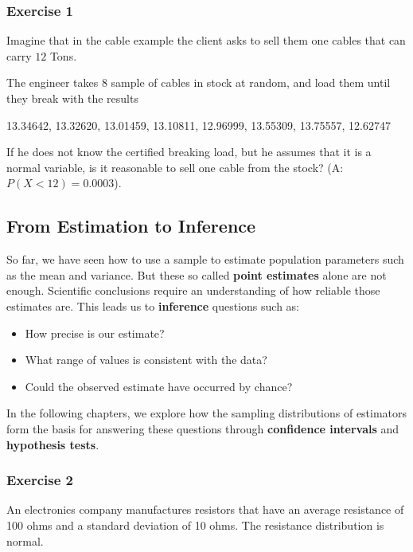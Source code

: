 \documentclass[
]{book}
\providecommand{\tightlist}{%
  \setlength{\itemsep}{0pt}\setlength{\parskip}{0pt}}
\begin{document}
\hypertarget{exercise-1-7}{%
\subsubsection{Exercise 1}\label{exercise-1-7}}

Imagine that in the cable example the client asks to sell them one cables that can carry \(12\) Tons.

The engineer takes \(8\) sample of cables in stock at random, and load them until they break with the results

13.34642, 13.32620, 13.01459, 13.10811, 12.96999, 13.55309, 13.75557, 12.62747

If he does not know the certified breaking load, but he assumes that it is a normal variable, is it reasonable to sell one cable from the stock? (A: \(P(X<12)=0.0003\)).

\hypertarget{from-estimation-to-inference}{%
\subsection{From Estimation to Inference}\label{from-estimation-to-inference}}

So far, we have seen how to use a sample to estimate population parameters such as the mean and variance. But these so called \textbf{point estimates} alone are not enough. Scientific conclusions require an understanding of how reliable those estimates are. This leads us to \textbf{inference} questions such as:

\begin{itemize}
\tightlist
\item
  How precise is our estimate?
\item
  What range of values is consistent with the data?
\item
  Could the observed estimate have occurred by chance?
\end{itemize}

In the following chapters, we explore how the sampling distributions of estimators form the basis for answering these questions through \textbf{confidence intervals} and \textbf{hypothesis tests}.

\hypertarget{exercise-2-7}{%
\subsubsection{Exercise 2}\label{exercise-2-7}}

An electronics company manufactures resistors that have an average resistance of 100 ohms and
a standard deviation of 10 ohms. The resistance distribution is normal.
\end{document}
